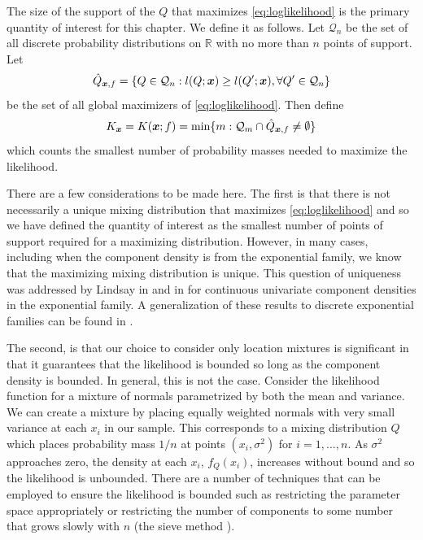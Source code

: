 	The size of the support of the $Q$ that maximizes \eqref{eq:loglikelihood} is the primary quantity of interest for this chapter. We define it as follows. Let $\mathcal{Q}_n$ be the set of all discrete probability distributions on $\mathbb{R}$ with no more than $n$ points of support. Let
	\begin{equation}
		\hat{Q}_{{\bm{{x}}},f} = \{Q \in \mathcal{Q}_n: l(Q;{\bm{{x}}}) \geq l(Q';{\bm{{x}}}), \forall Q' \in \mathcal{Q}_n\}
	\end{equation}
	be the set of all global maximizers of \eqref{eq:loglikelihood}. Then define
	\begin{equation}
		K_{\bm{{x}}} = K({\bm{{x}}}; f) = \min\{m : \mathcal{Q}_m \cap \hat{Q}_{{\bm{{x}}},f} \neq \emptyset\}
		\label{eq:K_x definition}
	\end{equation}
	which counts the smallest number of probability masses needed to maximize the likelihood.


	There are a few considerations to be made here. The first is that there is not necessarily a unique mixing distribution that maximizes \eqref{eq:loglikelihood} and so we have defined the quantity of interest as the smallest number of points of support required for a maximizing distribution. However, in many cases, including when the component density is from the exponential family, we know that the maximizing mixing distribution is unique. This question of uniqueness was addressed by Lindsay in \cite{Lindsay1983-tf} and in \cite{Lindsay1983a-he} for continuous univariate component densities in the exponential family. A generalization of these results to discrete exponential families can be found in \cite{Lindsay1993-rj}.

	The second, is that our choice to consider only location mixtures is significant in that it guarantees that the likelihood is bounded so long as the component density is bounded. In general, this is not the case. Consider the likelihood function for a mixture of normals parametrized by both the mean and variance. We can create a mixture by placing equally weighted normals with very small variance at each $x_i$ in our sample. This corresponds to a mixing distribution $Q$ which places probability mass $1/n$ at points $(x_i, \sigma^2)$ for $i = 1, \dots, n$. As $\sigma^2$ approaches zero, the density at each $x_i$, $f_Q(x_i)$, increases without bound and so the likelihood is unbounded. There are a number of techniques that can be employed to ensure the likelihood is bounded such as restricting the parameter space appropriately or restricting the number of components to some number that grows slowly with $n$ (the sieve method \cite{Grenander1981-dy}).

